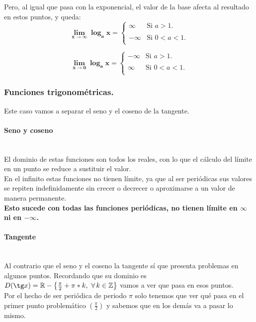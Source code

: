 \documentclass[a4paper,11pt,answers]{exam}
\begin{document}
Pero, al igual que pasa con la exponencial, el valor de la base afecta al resultado en estos puntos, y queda:
\[\boldsymbol{\lim_{x \to \infty} \log_a x =} \left\lbrace
\begin{array}{ll}
\boldsymbol{\infty}&\text{{Si $a>1$.}}\\
&\\
\boldsymbol{-\infty}&\text{{Si $0<a<1$.}}\\
\end{array}\right.\]

\[\boldsymbol{\lim_{x \to 0} \log_a x =} \left\lbrace
\begin{array}{ll}
\boldsymbol{-\infty}&\text{{Si $a>1$.}}\\
&\\
\boldsymbol{\infty}&\text{{Si $0<a<1$.}}\\
\end{array}\right.\]
\subsubsection{Funciones trigonométricas.}
Este caso vamos a separar el seno y el coseno de la tangente.

\paragraph{Seno y coseno}\mbox{}\\
El dominio de estas funciones son todos los reales, con lo que el cálculo del límite en un punto se reduce a sustituir el valor.\\

En el infinito estas funciones no tienen límite, ya que al ser periódicas sus valores se repiten indefinidamente sin crecer o decrecer o aproximarse a un valor de manera permanente.\\
\textbf{Esto sucede con todas las funciones periódicas, no tienen límite en $\infty$ ni en $-\infty$.}

\paragraph{Tangente}\mbox{}\\
Al contrario que el seno y el coseno la tangente sí que presenta problemas en algunos puntos. Recordando que su dominio es $D(\tg x) = \mathbb{R} - \left\lbrace\frac{\pi}{2} + \pi*k,\ \forall\,k \in \mathbb{Z}\right\rbrace$ vamos a ver que pasa en esos puntos.\\
Por el hecho de ser periódica de periodo $\pi$ solo tenemos que ver qué pasa en el primer punto problemático $\left(\frac{\pi}{2}\right)$ y sabemos que en los demás va a pasar lo mismo.\\
\end{document}
